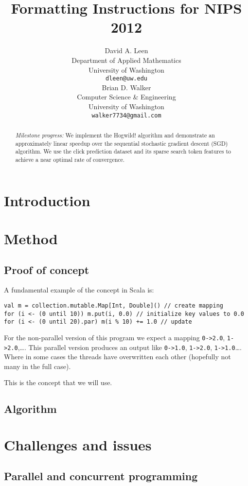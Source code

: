 \documentclass{article} %
\title{Formatting Instructions for NIPS 2012}
\author{
David A. Leen \\
Department of Applied Mathematics\\
University of Washington \\
\texttt{dleen@uw.edu} \\
\And
Brian D. Walker \\
Computer Science \& Engineering \\
University of Washington \\
\texttt{walker7734@gmail.com} \\
}
\begin{document}
\maketitle

\begin{abstract}
{\em Milestone progress:} We implement the Hogwild! algorithm and demonstrate an approximately linear speedup over the 
sequential stochastic gradient descent (SGD) algorithm.  We use the click prediction dataset and its sparse search token features to achieve a near optimal rate of convergence.
\end{abstract}

\section{Introduction}

\section{Method}

\subsection{Proof of concept}
A fundamental example of the concept in Scala is:
\begin{lstlisting}
val m = collection.mutable.Map[Int, Double]() // create mapping
for (i <- (0 until 10)) m.put(i, 0.0) // initialize key values to 0.0
for (i <- (0 until 20).par) m(i % 10) += 1.0 // update 
\end{lstlisting}
For the non-parallel version of this program we expect a mapping  \verb+0->2.0+, \verb+1->2.0+,\ldots. This parallel version produces an output like \verb+0->1.0+, \verb+1->2.0+, \verb+1->1.0+\ldots. Where in some cases the threads have overwritten each other (hopefully not many in the full case).

This is the concept that we will use.
\subsection{Algorithm}

\section{Challenges and issues}
\label{gen_inst}

\subsection{Parallel and concurrent programming}
\end{document}

